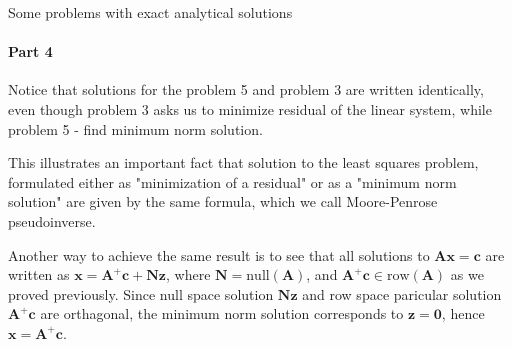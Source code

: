 \documentclass{beamer}
\begin{document}
\begin{frame}{Some problems with exact analytical solutions}
\framesubtitle{Part 4}
\begin{flushleft}

Notice that solutions for the problem 5 and problem 3 are written identically, even though problem 3 asks us to minimize residual of the linear system, while problem 5 - find minimum norm solution. 

\bigskip

This illustrates an important fact that solution to the least squares problem, formulated either as "minimization of a residual" or as a "minimum norm solution" are given by the same formula, which we call Moore-Penrose pseudoinverse.

\bigskip

Another way to achieve the same result is to see that all solutions to $\mathbf{A} \mathbf{x} = \mathbf{c}$ are written as $\mathbf{x} = \mathbf{A}^+\mathbf{c} + \mathbf{N}\mathbf{z}$, where $\mathbf{N} = \text{null}(\mathbf{A})$, and $\mathbf{A}^+\mathbf{c} \in \text{row}(\mathbf{A})$ as we proved previously. Since null space solution $\mathbf{N}\mathbf{z}$ and row space paricular solution $\mathbf{A}^+\mathbf{c}$ are orthagonal, the minimum norm solution corresponds to $\mathbf{z} = \mathbf{0}$, hence $\mathbf{x} = \mathbf{A}^+\mathbf{c}$.

\end{flushleft}
\end{frame}
\end{document}
